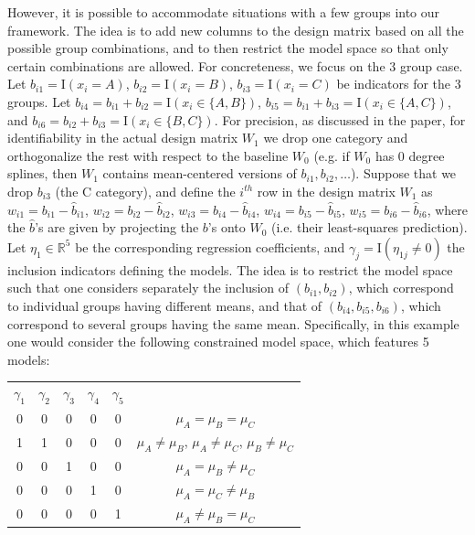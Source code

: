 However, it is possible to accommodate situations with a few groups into our framework. 
The idea is to add new columns to the design matrix based on all the possible group combinations, and to then restrict the model space so that only certain combinations are allowed.
For concreteness, we focus on the 3 group case.
Let $b_{i1}= \mbox{I}(x_i = A)$, $b_{i2}= \mbox{I}(x_i= B)$, $b_{i3}= \mbox{I}(x_i= C)$ be indicators for the 3 groups. 
Let $b_{i4}= b_{i1} + b_{i2}= \mbox{I}(x_i \in \{A,B\})$, 
$b_{i5}= b_{i1} + b_{i3}= \mbox{I}(x_i \in \{A,C\})$,
and $b_{i6}= b_{i2} + b_{i3}= \mbox{I}(x_i \in \{B,C\})$.
For precision, as discussed in the paper, for identifiability in the actual design matrix $W_1$ we drop one category and orthogonalize the rest with respect to the baseline $W_0$ (e.g. if $W_0$ has 0 degree splines, then $W_1$ contains mean-centered versions of $b_{i1},b_{i2},\ldots$). 
Suppose that we drop $b_{i3}$ (the C category), and define the $i^{th}$ row in the design matrix $W_1$ as
$w_{i1}= b_{i1} - \hat{b}_{i1}$, $w_{i2}= b_{i2} - \hat{b}_{i2}$, $w_{i3}= b_{i4} - \hat{b}_{i4}$, $w_{i4}= b_{i5}-\hat{b}_{i5}$, $w_{i5}= b_{i6} - \hat{b}_{i6}$, where the $\hat{b}$'s are given by projecting the $b$'s onto $W_0$ (i.e. their least-squares prediction).
Let $\eta_1 \in \mathbb{R}^5$ be the corresponding regression coefficients, and $\gamma_j= \mbox{I}(\eta_{1j} \neq 0)$ the inclusion indicators defining the models.
The idea is to restrict the model space such that one considers separately the inclusion of $(b_{i1},b_{i2})$, which correspond to individual groups having different means,
 and that of $(b_{i4},b_{i5},b_{i6})$, which correspond to several groups having the same mean.
Specifically, in this example one would consider the following constrained model space, which features 5 models:
\begin{center}
\begin{tabular}{cccccc}
$\gamma_1$ & $\gamma_2$ & $\gamma_3$ & $\gamma_4$ & $\gamma_5$ & \\
0 & 0 & 0 & 0 & 0  & $\mu_A=\mu_B=\mu_C$  \\
1 & 1 & 0 & 0 & 0  & $\mu_A\neq \mu_B$, $\mu_A \neq \mu_C$, $\mu_B \neq \mu_C$  \\
0 & 0 & 1 & 0 & 0  & $\mu_A= \mu_B \neq \mu_C$  \\
0 & 0 & 0 & 1 & 0  & $\mu_A= \mu_C \neq \mu_B$  \\
0 & 0 & 0 & 0 & 1  & $\mu_A \neq \mu_B = \mu_C$  \\
\end{tabular}
\end{center}

